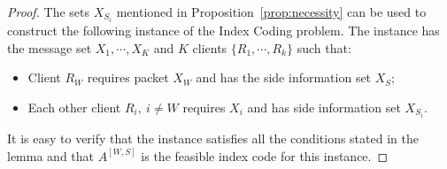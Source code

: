 \documentclass[letterpaper, 10 pt, conference]{ieeeconf}
\newcommand\salimn[1]{\notee[salim]{#1}}
\newcommand{\Xj}[1]{X_{#1}} %
\newcommand{\A}[2]{A^{[#1,#2]}} %
\begin{document}
\begin{proof}
The sets $\Xj{S_i}$ mentioned in Proposition~\ref{prop:necessity} can be used to construct the following instance of the Index Coding problem.  The instance has the message set $X_1, \cdots, X_K$ and  $K$ %
clients $\{R_1,\cdots,R_k\}$ such that:
\begin{itemize}
	\item Client $R_W$ requires packet $X_W$ and has the side information set $\Xj{S}$;
	\item Each other client $R_i,\ i\neq W$ requires $X_i$ and has side information set $\Xj{S_i}$.
\end{itemize} 
It is easy to verify that the instance satisfies all the conditions stated in the lemma and that  $\A{W}{S}$ is the feasible index code for this instance.  
\end{proof}


\end{document}
